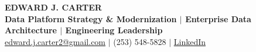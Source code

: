 \begin{center}
	{\LARGE \textbf{EDWARD J. CARTER}}\\[3pt]
	\textbf{Data Platform Strategy \& Modernization $|$ Enterprise Data Architecture $|$ Engineering Leadership}\\[3pt]
	\href{mailto:edward.j.carter2@gmail.com}{edward.j.carter2@gmail.com} $|$ (253) 548-5828 $|$ \href{https://www.linkedin.com/}{LinkedIn}

\end{center}
\vspace{-0.6em}